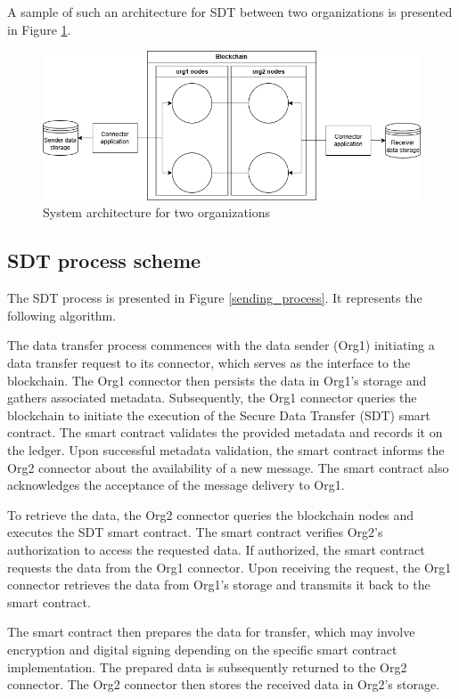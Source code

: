 \documentclass[10pt]{llncs}
\begin{document}
A sample of such an architecture for SDT between two organizations is presented in Figure \ref{system_architecture}.

\begin{figure}
    \includegraphics[width=\textwidth]{system_architecture.png}
    \caption{System architecture for two organizations} \label{system_architecture}
\end{figure}

\subsection{SDT process scheme}

The SDT process is presented in Figure \ref{sending_process}.
It represents the following algorithm.

The data transfer process commences with the data sender (Org1) initiating a data transfer request to its connector, which serves as the interface to the blockchain. 
The Org1 connector then persists the data in Org1's storage and gathers associated metadata. 
Subsequently, the Org1 connector queries the blockchain to initiate the execution of the Secure Data Transfer (SDT) smart contract. 
The smart contract validates the provided metadata and records it on the ledger. 
Upon successful metadata validation, the smart contract informs the Org2 connector about the availability of a new message. 
The smart contract also acknowledges the acceptance of the message delivery to Org1.

To retrieve the data, the Org2 connector queries the blockchain nodes and executes the SDT smart contract. 
The smart contract verifies Org2's authorization to access the requested data. 
If authorized, the smart contract requests the data from the Org1 connector. 
Upon receiving the request, the Org1 connector retrieves the data from Org1's storage and transmits it back to the smart contract.

The smart contract then prepares the data for transfer, which may involve encryption and digital signing depending on the specific smart contract implementation. 
The prepared data is subsequently returned to the Org2 connector. The Org2 connector then stores the received data in Org2's storage.
\end{document}
